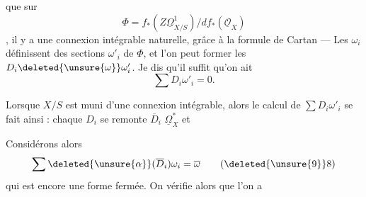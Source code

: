 que  sur
\[
 \boxed{\Phi=f_*(Z\underline{\Omega}^{1}_{X/S})/d f_*(\underline{\mathcal O}_X)}
 \tag*{(6)}
\]
, il y a une connexion intégrable naturelle, grâce à la formule de Cartan --- Les $\omega_i$ définissent des sections $\omega'_i$ de $\Phi$, et l'on peut former les $D_i\deleted{\unsure{\omega}}\omega'_i$. Je dis qu'il suffit qu'on ait
\[
 \sum D_i\omega'_i=0.\tag*{(7)}
\]

Lorsque $X/S$ est muni d'une connexion intégrable, alors le calcul de $\sum D_i\omega'_i$ se fait ainsi :  chaque $D_i$ se remonte   $\overline D_i$  $\underline{\Omega}^*_X$  et 

\deleted{\[
\boxed{\begin{aligned}
 (8)\quad &\alpha_{\deleted{\unsure{D_i}}\overline D_i}\omega_i
 =\alpha_{\overline D_i^0}\omega_i+c_i\,\omega_i\\
 &\left\{\begin{aligned}
 \overline D_i&=\overline D_i^0+c_i\,\mathrm{id}
 &\left\{\begin{aligned}&\overline D_i^0\text{ à coeff. cts}\\
                         &c_i\text{ section de }\underline{\mathcal O}_X\end{aligned}\right.\\
 (9)\quad\alpha_{\overline D_i^0}\,d\varphi&=\deleted{\unsure{\alpha_i}}\overline D_i^0\varphi
 \end{aligned}\right.
\end{aligned}}
\]}

Considérons alors
\[
 \sum \deleted{\unsure{\alpha}}(\overline D_i)\omega_i=\overline\omega
 \tag*{(\deleted{\unsure{9}}8)}
\]
qui est encore une forme fermée. On vérifie alors  que l'on a
